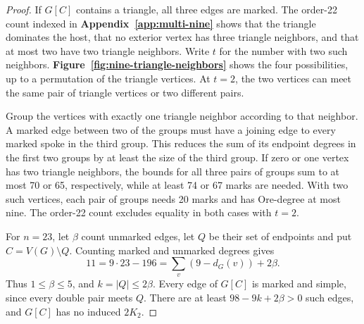 \begin{proof}
If $G[C]$ contains a triangle, all three edges are marked. The
order-22 count indexed in \textbf{Appendix~\ref{app:multi-nine}}
shows that the triangle dominates the host, that no exterior vertex
has three triangle neighbors, and that at most two have two
triangle neighbors. Write $t$ for the number with two such neighbors.
\textbf{Figure~\ref{fig:nine-triangle-neighbors}} shows the four
possibilities, up to a permutation of the triangle vertices. At
$t=2$, the two vertices can meet the same pair of triangle vertices
or two different pairs.

Group the vertices with exactly one triangle
neighbor according to that neighbor. A marked edge between two
of the groups must have a joining edge to every marked spoke in
the third group. This reduces the sum of its endpoint degrees
in the first two groups by at least the size of the third group.
If zero or one vertex has two triangle neighbors, the bounds for
all three pairs of groups sum to at most 70 or 65, respectively,
while at least 74 or 67 marks are needed. With two such vertices,
each pair of groups needs 20 marks and has Ore-degree at most nine.
The order-22 count excludes equality in both cases with $t=2$.

For $n=23$, let $\beta$ count unmarked edges, let $Q$ be
their set of endpoints and put $C=V(G)\setminus Q$.
Counting marked and unmarked degrees gives
\[
 11=9\cdot23-196=\sum_v(9-d_G(v))+2\beta.
\]
Thus $1\le\beta\le5$, and $k=|Q|\le2\beta$. Every edge
of $G[C]$ is marked and simple, since every double pair
meets $Q$. There are at least $98-9k+2\beta>0$ such
edges, and $G[C]$ has no induced $2K_2$.


\end{proof}

